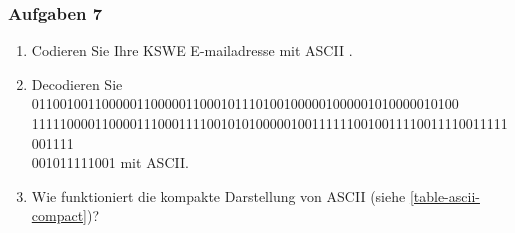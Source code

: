 \subsubsection{Aufgaben 7}

\begin{enumerate}
\item Codieren Sie Ihre KSWE E-mailadresse mit \ac{ASCII} .
\item Decodieren Sie 0110010011000001100000110001011101001000001000001010000010100\\11111000011000011100011110010101000001001111110010011110011110011111001111\\001011111001 mit \ac{ASCII}.
\item Wie funktioniert die kompakte Darstellung von \ac{ASCII} (siehe \autoref{table-ascii-compact})?
\end{enumerate}

